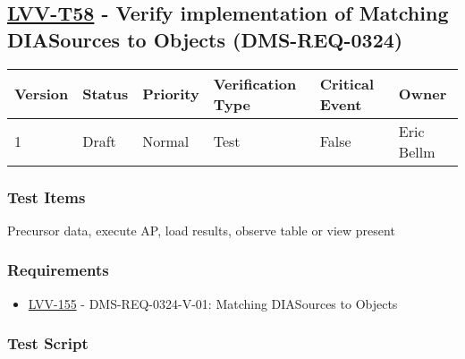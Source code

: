 \hypertarget{lvv-t58---verify-implementation-of-matching-diasources-to-objects-dms-req-0324}{%
\subsection{\texorpdfstring{\href{https://jira.lsstcorp.org/secure/Tests.jspa\#/testCase/LVV-T58}{LVV-T58}
- Verify implementation of Matching DIASources to Objects
(DMS-REQ-0324)}{LVV-T58 - Verify implementation of Matching DIASources to Objects (DMS-REQ-0324)}}\label{lvv-t58---verify-implementation-of-matching-diasources-to-objects-dms-req-0324}}

\begin{longtable}[]{@{}llllll@{}}
\toprule
Version & Status & Priority & Verification Type & Critical Event &
Owner\tabularnewline
\midrule
\endhead
1 & Draft & Normal & Test & False & Eric Bellm\tabularnewline
\bottomrule
\end{longtable}

\hypertarget{test-items-147}{%
\subsubsection{Test Items}\label{test-items-147}}

Precursor data, execute AP, load results, observe table or view present

\hypertarget{requirements-148}{%
\subsubsection{Requirements}\label{requirements-148}}

\begin{itemize}
\tightlist
\item
  \href{https://jira.lsstcorp.org/browse/LVV-155}{LVV-155} -
  DMS-REQ-0324-V-01: Matching DIASources to Objects
\end{itemize}

\hypertarget{test-script-148}{%
\subsubsection{Test Script}\label{test-script-148}}

